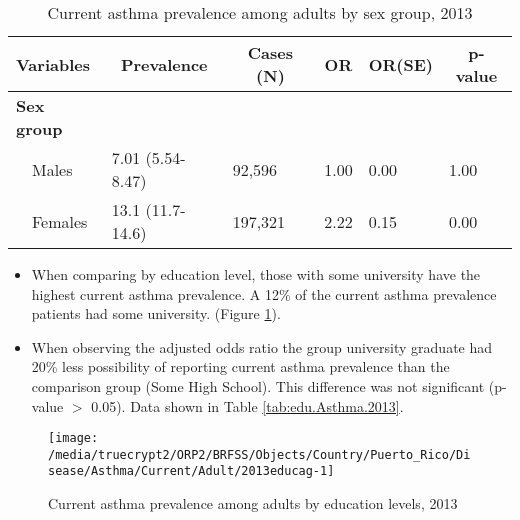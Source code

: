 \begin{table}[H]
\caption{Current asthma prevalence  among adults by sex group, 2013\label{tab:sex.Asthma.2013}} 
\begin{center}
\begin{tabular}{llllll}
\hline\hline
\multicolumn{1}{l}{Variables}&\multicolumn{1}{c}{Prevalence}&\multicolumn{1}{c}{Cases (N)}&\multicolumn{1}{c}{OR}&\multicolumn{1}{c}{OR(SE)}&\multicolumn{1}{c}{p-value}\tabularnewline
\hline
{\bfseries Sex group}&&&&&\tabularnewline
~~Males&7.01 (5.54-8.47)& 92,596&1.00&0.00&1.00\tabularnewline
~~Females&13.1 (11.7-14.6)&197,321&2.22&0.15&0.00\tabularnewline
\hline
\end{tabular}\end{center}

\end{table}


\newpage
\begin{itemize}

\item When comparing by education level, those with
some university
have the highest current asthma prevalence. A 12\% of the current asthma prevalence patients had some university.
(Figure \ref{fig:edu.Asthma.2013}).

\item 
When observing the adjusted odds ratio the group university graduate had 20\% less possibility of reporting current asthma prevalence than the comparison group (Some High School).
This difference was not significant (p-value $>$ 0.05).  Data shown in Table \ref{tab:edu.Asthma.2013}.

\end{itemize}

\begin{figure}[H]
\caption{Current asthma prevalence among adults by education levels, 
         2013}
\begin{knitrout}
\color{fgcolor}

{\centering \texttt{[image: /media/truecrypt2/ORP2/BRFSS/Objects/Country/Puerto\_Rico/Disease/Asthma/Current/Adult/2013educag-1]} 

}



\end{knitrout}
 \label{fig:edu.Asthma.2013}
\end{figure}

